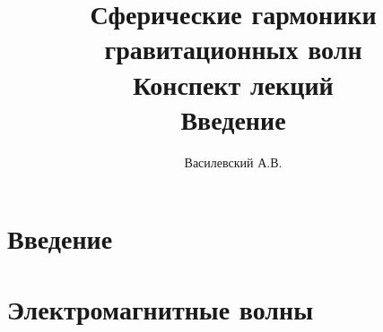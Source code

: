 \documentclass[12pt,a5paper]{article}
\title{Сферические гармоники гравитационных волн\\ Конспект лекций\\ Введение}
\author{Василевский А.В.}
\providecommand{\docroot}{../..}
\begin{document}
    \makedocroot

    \maketitle
    \tableofcontents

    \section{Введение}
    

    \section{Электромагнитные волны}
    

    \begin{appendix}

    \end{appendix}

    \clearpage

    \nocite{sivuhin_elect}
    
    
\end{document}
